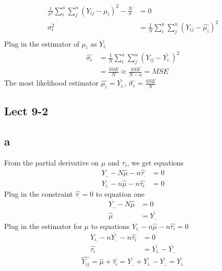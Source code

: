 \documentclass[11pt,letterpaper]{article}
\begin{document}
\begin{align*}
\frac{1}{\sigma^3} \sum_i^a \sum_j^n (Y_{ij} - \mu_i)^2 - \frac{N}{\sigma} &= 0 \\
\sigma_{\epsilon}^2 &= \frac{1}{N} \sum_i^a \sum_j^n (Y_{ij} - \hat{\mu_i})^2 \\
\end{align*}
\noindent Plug in the estimator of $ \mu_i$ as $\bar{Y_{i.}}$
\begin{align*}
\hat{\sigma_{\epsilon}} &=  \frac{1}{N} \sum_i^a \sum_j^n (Y_{ij} - \bar{Y_{i.}} )^2 \\
&= \frac{SSE}{N} \approx \frac{SSE}{N-a} = MSE
\end{align*}
\noindent The most likelihood estimator $\hat{\mu_i} = \bar{Y_{i.}}$, $\hat{\sigma_{\epsilon}} = \frac{SSE}{N}$

\subsection*{Lect 9-2}
\subsection*{a}
\noindent From the partial derivative on $\mu$ and $\tau_i$, we get equations 
\begin{align*}
Y_{..} - N \hat{\mu} - n\hat{\tau_.} &= 0 \\
Y_{i.} - n \hat{\mu} - n\hat{\tau_i} &= 0
\end{align*}
\noindent Plug in the constraint $\hat{\tau_.} = 0$ to equation one
\begin{align*}
Y_{..} - N \hat{\mu} &= 0 \\
\hat{\mu} &= \bar{Y_{..}}
\end{align*}
\noindent Plug in the estimator for $\mu$ to equations $Y_{i.} - n \hat{\mu} - n\hat{\tau_i} = 0$
\begin{align*}
Y_{i.} - n\bar{Y_{..}} - n\hat{\tau_i} &= 0 \\
\hat{\tau_i} &= \bar{Y_{i.}} - \bar{Y_{..}}
\end{align*}
\begin{align*}
\hat{Y_{ij}} = \hat{\mu} + \hat{\tau_i} =  \bar{Y_{..}} + \bar{Y_{i.}} - \bar{Y_{..}} = \bar{Y_{i.}}
\end{align*}
\end{document}
